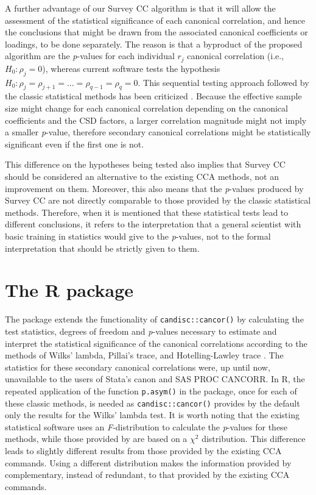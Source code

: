 A further advantage of our Survey CC algorithm is that it will allow the assessment of the statistical significance of each canonical correlation, and hence the conclusions that might be drawn from the associated canonical coefficients or loadings, to be done separately. The reason is that a byproduct of the proposed algorithm are the \emph{p}-values for each individual \(r_j\) canonical correlation (i.e., \(H_0:\rho_j=0\)), whereas current software tests the hypothesis \(H_0:\rho_j=\rho_{j+1}=\dots=\rho_{q-1}=\rho_q=0\). This sequential testing approach followed by the classic statistical methods has been criticized \cite{harris1976}. Because the effective sample size might change for each canonical correlation depending on the canonical coefficients and the CSD factors, a larger correlation magnitude might not imply a smaller \emph{p}-value, therefore secondary canonical correlations might be statistically significant even if the first one is not.

This difference on the hypotheses being tested also implies that Survey CC should be considered an alternative to the existing CCA methods, not an improvement on them. Moreover, this also means that the \emph{p}-values produced by Survey CC are not directly comparable to those provided by the classic statistical methods. Therefore, when it is mentioned that these statistical tests lead to different conclusions, it refers to the interpretation that a general scientist with basic training in statistics would give to the \emph{p}-values, not to the formal interpretation that should be strictly given to them.

\hypertarget{the-r-package}{%
\section{The R package}\label{the-r-package}}

The package  extends the functionality of \texttt{candisc::cancor()} by calculating the test statistics, degrees of freedom and \emph{p}-values necessary to estimate and interpret the statistical significance of the canonical correlations according to the methods of Wilks' lambda, Pillai's trace, and Hotelling-Lawley trace \citep{cal2006}. The statistics for these secondary canonical correlations were, up until now, unavailable to the users of Stata's canon and SAS PROC CANCORR. In R, the repeated application of the function \texttt{p.asym()} in the  package, once for each of these classic methods, is needed as \texttt{candisc::cancor()} provides by the default only the results for the Wilks' lambda test. It is worth noting that the existing statistical software uses an \emph{F}-distribution to calculate the \emph{p}-values for these methods, while those provided by  are based on a \(\chi ^2\) distribution. This difference leads to slightly different results from those provided by the existing CCA commands. Using a different distribution makes the information provided by  complementary, instead of redundant, to that provided by the existing CCA commands.

